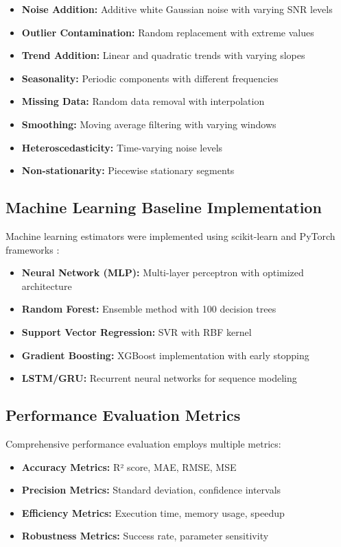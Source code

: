 \begin{itemize}
    \item \textbf{Noise Addition:} Additive white Gaussian noise with varying SNR levels
    \item \textbf{Outlier Contamination:} Random replacement with extreme values
    \item \textbf{Trend Addition:} Linear and quadratic trends with varying slopes
    \item \textbf{Seasonality:} Periodic components with different frequencies
    \item \textbf{Missing Data:} Random data removal with interpolation
    \item \textbf{Smoothing:} Moving average filtering with varying windows
    \item \textbf{Heteroscedasticity:} Time-varying noise levels
    \item \textbf{Non-stationarity:} Piecewise stationary segments
\end{itemize}

\subsection{Machine Learning Baseline Implementation}

Machine learning estimators were implemented using scikit-learn and PyTorch frameworks \citep{Paszke2019, Abadi2016}:

\begin{itemize}
    \item \textbf{Neural Network (MLP):} Multi-layer perceptron with optimized architecture
    \item \textbf{Random Forest:} Ensemble method with 100 decision trees
    \item \textbf{Support Vector Regression:} SVR with RBF kernel
    \item \textbf{Gradient Boosting:} XGBoost implementation with early stopping
    \item \textbf{LSTM/GRU:} Recurrent neural networks for sequence modeling
\end{itemize}

\subsection{Performance Evaluation Metrics}

Comprehensive performance evaluation employs multiple metrics:

\begin{itemize}
    \item \textbf{Accuracy Metrics:} R² score, MAE, RMSE, MSE
    \item \textbf{Precision Metrics:} Standard deviation, confidence intervals
    \item \textbf{Efficiency Metrics:} Execution time, memory usage, speedup
    \item \textbf{Robustness Metrics:} Success rate, parameter sensitivity
\end{itemize}

